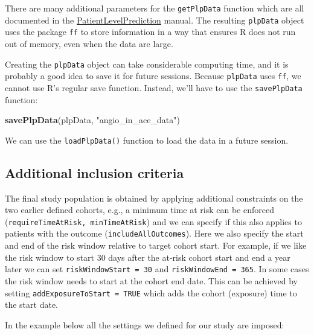 \documentclass[11pt]{book}
\newenvironment{Shaded}{\begin{snugshade}}{\end{snugshade}}
\newcommand{\KeywordTok}[1]{\textcolor[rgb]{0.13,0.29,0.53}{\textbf{#1}}}
\newcommand{\NormalTok}[1]{#1}
\newcommand{\StringTok}[1]{\textcolor[rgb]{0.31,0.60,0.02}{#1}}
\theoremstyle{definition}
\theoremstyle{definition}
\theoremstyle{definition}
\theoremstyle{remark}
\begin{document}
There are many additional parameters for the \texttt{getPlpData} function which are all documented in the \href{https://ohdsi.github.io/PatientLevelPrediction/}{PatientLevelPrediction} manual. The resulting \texttt{plpData} object uses the package \texttt{ff} to store information in a way that ensures R does not run out of memory, even when the data are large.

Creating the \texttt{plpData} object can take considerable computing time, and it is probably a good idea to save it for future sessions. Because \texttt{plpData} uses \texttt{ff}, we cannot use R's regular save function. Instead, we'll have to use the \texttt{savePlpData} function:

\begin{Shaded}
\begin{Highlighting}[]
\KeywordTok{savePlpData}\NormalTok{(plpData, }\StringTok{"angio_in_ace_data"}\NormalTok{)}
\end{Highlighting}
\end{Shaded}

We can use the \texttt{loadPlpData()} function to load the data in a future session.

\hypertarget{additional-inclusion-criteria}{%
\subsection{Additional inclusion criteria}\label{additional-inclusion-criteria}}

The final study population is obtained by applying additional constraints on the two earlier defined cohorts, e.g., a minimum time at risk can be enforced (\texttt{requireTimeAtRisk,\ minTimeAtRisk}) and we can specify if this also applies to patients with the outcome (\texttt{includeAllOutcomes}). Here we also specify the start and end of the risk window relative to target cohort start. For example, if we like the risk window to start 30 days after the at-risk cohort start and end a year later we can set \texttt{riskWindowStart\ =\ 30} and \texttt{riskWindowEnd\ =\ 365}. In some cases the risk window needs to start at the cohort end date. This can be achieved by setting \texttt{addExposureToStart\ =\ TRUE} which adds the cohort (exposure) time to the start date.

In the example below all the settings we defined for our study are imposed:
\end{document}
